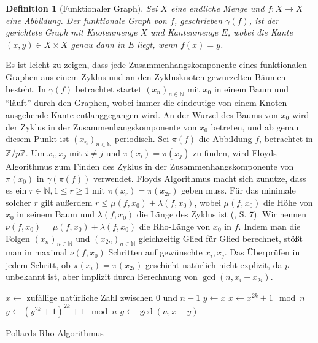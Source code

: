 \documentclass[a4paper, 10pt, ngerman]{article}
\newcommand{\N}{\mathbb{N}}
\newcommand{\Z}{\mathbb{Z}}
\newtheorem{definition}{Definition}
\begin{document}
\begin{definition}[Funktionaler Graph]
    Sei $X$ eine endliche Menge und $f: X \to X$ eine Abbildung. Der funktionale Graph von $f$, geschrieben $\gamma(f)$, ist der gerichtete Graph mit Knotenmenge $X$ und Kantenmenge $E$, wobei die Kante $(x, y) \in X \times X$ genau dann in $E$ liegt, wenn $f(x) = y$.
\end{definition}

\noindent Es ist leicht zu zeigen, dass jede Zusammenhangskomponente eines funktionalen Graphen aus einem Zyklus und an den Zyklusknoten gewurzelten Bäumen besteht. In $\gamma(f)$ betrachtet startet $(x_n)_{n \in \N}$ mit $x_0$ in einem Baum und "`läuft"' durch den Graphen, wobei immer die eindeutige von einem Knoten ausgehende Kante entlanggegangen wird. An der Wurzel des Baums von $x_0$ wird der Zyklus in der Zusammenhangskomponente von $x_0$ betreten, und ab genau diesem Punkt ist $(x_n)_{n \in \N}$ periodisch. Sei $\pi(f)$ die Abbildung $f$, betrachtet in $\Z/p\Z$. Um $x_i, x_j$ mit $i \ne j$ und $\pi(x_i) = \pi(x_j)$ zu finden, wird Floyds Algorithmus zum Finden des Zyklus in der Zusammenhangskomponente von $\pi(x_0)$ in $\gamma(\pi(f))$ verwendet. Floyds Algorithmus macht sich zunutze, dass es ein $r \in \N, 1 \le r \ge 1$ mit $\pi(x_r) = \pi(x_{2r})$ geben muss. Für das minimale solcher $r$ gilt außerdem $r \le \mu(f, x_0) + \lambda(f, x_0)$, wobei $\mu(f, x_0)$ die Höhe von $x_0$ in seinem Baum und $\lambda(f, x_0)$ die Länge des Zyklus ist (\cite{knu98}, S. 7). Wir nennen $\nu(f, x_0) = \mu(f, x_0) + \lambda(f, x_0)$ die Rho-Länge von $x_0$ in $f$. Indem man die Folgen $(x_n)_{n \in \N}$ und $(x_{2n})_{n \in \N}$ gleichzeitig Glied für Glied berechnet, stößt man in maximal $\nu(f, x_0)$ Schritten auf gewünschte $x_i, x_j$. Das Überprüfen in jedem Schritt, ob $\pi(x_i) = \pi(x_{2i})$ geschieht natürlich nicht explizit, da $p$ unbekannt ist, aber implizit durch Berechnung von $\gcd(n, x_i - x_{2i})$.

\begin{algorithm*}
    $x \gets $ zufällige natürliche Zahl zwischen $0$ und $n - 1$ \;
    $y \gets x$ \;
    {
        $x \gets x^{2k} + 1 \mod n$ \;
        $y \gets (y^{2k} + 1)^{2k} + 1 \mod n$ \;
        $g \gets \gcd(n, x - y)$ \;
        {
             \;
        }
    }

    \caption{Pollards Rho-Algorithmus}
\end{algorithm*}
\end{document}
